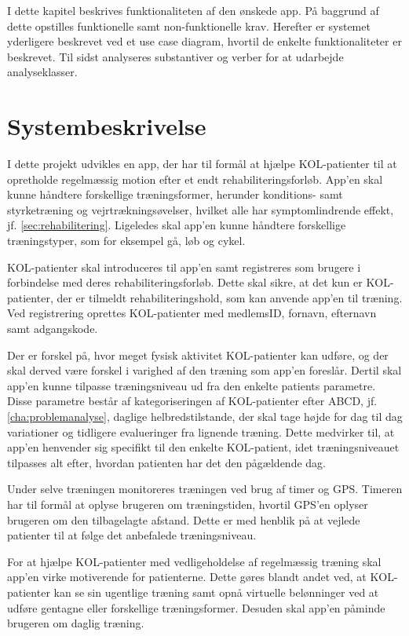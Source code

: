 I dette kapitel beskrives funktionaliteten af den ønskede app. På baggrund af dette opstilles funktionelle samt non-funktionelle krav. Herefter er systemet yderligere beskrevet ved et use case diagram, hvortil de enkelte funktionaliteter er beskrevet. Til sidst analyseres substantiver og verber for at udarbejde analyseklasser.  

\section{Systembeskrivelse} \label{sec:systembeskrivelse}
I dette projekt udvikles en app, der har til formål at hjælpe KOL-patienter til at opretholde regelmæssig motion efter et endt rehabiliteringsforløb. App'en skal kunne håndtere forskellige træningsformer, herunder konditions- samt styrketræning og vejrtrækningsøvelser, hvilket alle har symptomlindrende effekt, jf. \autoref{sec:rehabilitering}. Ligeledes skal app'en kunne håndtere forskellige træningstyper, som for eksempel gå, løb og cykel.

KOL-patienter skal introduceres til app'en samt registreres som brugere i forbindelse med deres rehabiliteringsforløb. 
Dette skal sikre, at det kun er KOL-patienter, der er tilmeldt rehabiliteringshold, som kan anvende app'en til træning. Ved registrering oprettes KOL-patienter med medlemsID, fornavn, efternavn samt adgangskode.  

Der er forskel på, hvor meget fysisk aktivitet KOL-patienter kan udføre, og der skal derved være forskel i varighed af den træning som app'en foreslår. Dertil skal app'en kunne tilpasse træningsniveau ud fra den enkelte patients parametre. Disse parametre består af kategoriseringen af KOL-patienter efter ABCD, jf. \autoref{cha:problemanalyse}, daglige helbredstilstande, der skal tage højde for dag til dag variationer og tidligere evalueringer fra lignende træning. Dette medvirker til, at app'en henvender sig specifikt til den enkelte KOL-patient, idet træningsniveauet tilpasses alt efter, hvordan patienten har det den pågældende dag.

Under selve træningen monitoreres træningen ved brug af timer og GPS. Timeren har til formål at oplyse brugeren om træningstiden, hvortil GPS'en oplyser brugeren om den tilbagelagte afstand. Dette er med henblik på at vejlede patienter til at følge det anbefalede træningsniveau. 

For at hjælpe KOL-patienter med vedligeholdelse af regelmæssig træning skal app’en virke motiverende for patienterne. Dette gøres blandt andet ved, at KOL-patienter kan se sin ugentlige træning samt opnå virtuelle belønninger ved at udføre gentagne eller forskellige træningsformer. Desuden skal app'en påminde brugeren om daglig træning.\citep{Gade2007, Tricomi2016}


